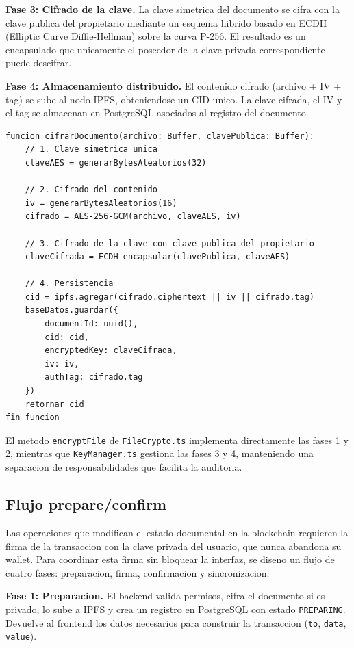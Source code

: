 \documentclass[11pt, a4paper]{article}
\begin{document}
\textbf{Fase 3: Cifrado de la clave.} La clave simetrica del documento se cifra con la clave publica del propietario mediante un esquema hibrido basado en ECDH (Elliptic Curve Diffie-Hellman) sobre la curva P-256. El resultado es un encapsulado que unicamente el poseedor de la clave privada correspondiente puede descifrar.

\textbf{Fase 4: Almacenamiento distribuido.} El contenido cifrado (archivo + IV + tag) se sube al nodo IPFS, obteniendose un CID unico. La clave cifrada, el IV y el tag se almacenan en PostgreSQL asociados al registro del documento.

\begin{lstlisting}[caption={Pseudocodigo del flujo de cifrado completo}, label={lst:cifrado-completo}]
funcion cifrarDocumento(archivo: Buffer, clavePublica: Buffer):
    // 1. Clave simetrica unica
    claveAES = generarBytesAleatorios(32)
    
    // 2. Cifrado del contenido
    iv = generarBytesAleatorios(16)
    cifrado = AES-256-GCM(archivo, claveAES, iv)
    
    // 3. Cifrado de la clave con clave publica del propietario
    claveCifrada = ECDH-encapsular(clavePublica, claveAES)
    
    // 4. Persistencia
    cid = ipfs.agregar(cifrado.ciphertext || iv || cifrado.tag)
    baseDatos.guardar({
        documentId: uuid(),
        cid: cid,
        encryptedKey: claveCifrada,
        iv: iv,
        authTag: cifrado.tag
    })
    retornar cid
fin funcion
\end{lstlisting}

El metodo \texttt{encryptFile} de \texttt{FileCrypto.ts} implementa directamente las fases 1 y 2, mientras que \texttt{KeyManager.ts} gestiona las fases 3 y 4, manteniendo una separacion de responsabilidades que facilita la auditoria.

\subsection{Flujo prepare/confirm}

Las operaciones que modifican el estado documental en la blockchain requieren la firma de la transaccion con la clave privada del usuario, que nunca abandona su wallet. Para coordinar esta firma sin bloquear la interfaz, se diseno un flujo de cuatro fases: preparacion, firma, confirmacion y sincronizacion.

\textbf{Fase 1: Preparacion.} El backend valida permisos, cifra el documento si es privado, lo sube a IPFS y crea un registro en PostgreSQL con estado \texttt{PREPARING}. Devuelve al frontend los datos necesarios para construir la transaccion (\texttt{to}, \texttt{data}, \texttt{value}).
\end{document}
